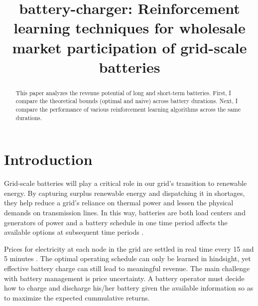 \documentclass[conference]{IEEEtran}
\begin{document}
\title{battery-charger: Reinforcement learning techniques for wholesale market participation of grid-scale batteries}

\author{
}


\maketitle

\begin{abstract}
    This paper analyzes the revenue potential of long and short-term batteries. First, I compare the theoretical bounds (optimal and naive) across battery durations. Next, I compare the performance of various reinforcement learning algorithms across the same durations.
\end{abstract}

\section{Introduction}
Grid-scale batteries will play a critical role in our grid's transition to renewable energy. By capturing surplus renewable energy and dispatching it in shortages, they help reduce a grid's reliance on thermal power and lessen the physical demands on transmission lines. In this way, batteries are both load centers and generators of power and a battery schedule in one time period affects the available options at subsequent time periods \cite{IEA}. 

Prices for electricity at each node in the grid are settled in real time every 15 and 5 minutes \cite{CAISO}. The optimal operating schedule can only be learned in hindsight, yet effective battery charge can still lead to meaningful revenue. The main challenge with battery management is price uncertainty. A battery operator must decide how to charge and discharge his/her battery given the available information so as to maximize the expected cummulative returns. 
\end{document}
